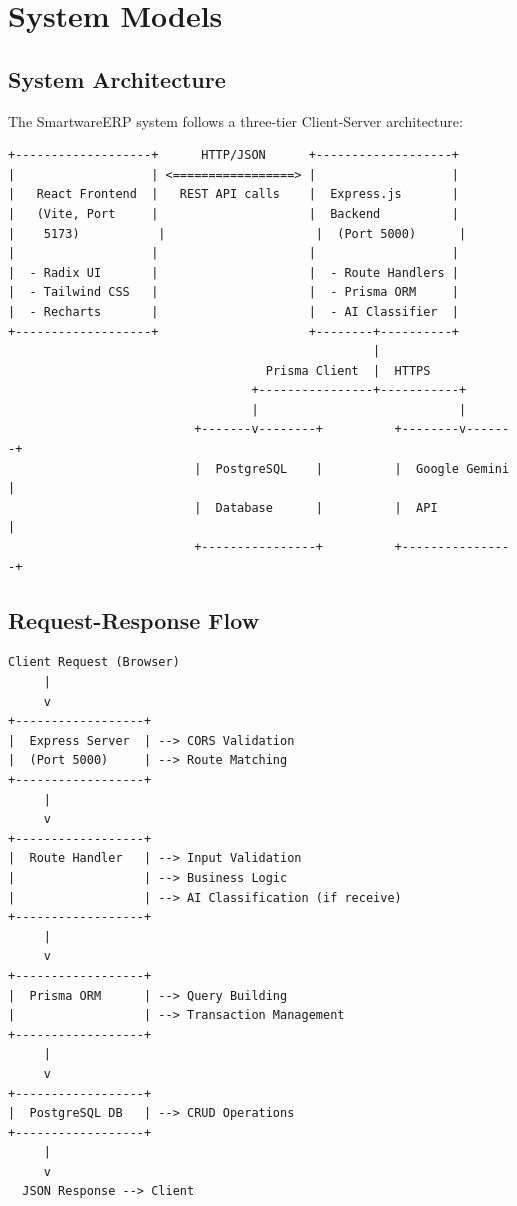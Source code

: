 \documentclass[12pt,a4paper]{report}
\begin{document}
\chapter{System Models}

\section{System Architecture}
The SmartwareERP system follows a three-tier Client-Server architecture:

\begin{verbatim}
+-------------------+      HTTP/JSON      +-------------------+
|                   | <=================> |                   |
|   React Frontend  |   REST API calls    |  Express.js       |
|   (Vite, Port     |                     |  Backend          |
|    5173)           |                     |  (Port 5000)      |
|                   |                     |                   |
|  - Radix UI       |                     |  - Route Handlers |
|  - Tailwind CSS   |                     |  - Prisma ORM     |
|  - Recharts       |                     |  - AI Classifier  |
+-------------------+                     +--------+----------+
                                                   |
                                    Prisma Client  |  HTTPS
                                  +----------------+-----------+
                                  |                            |
                          +-------v--------+          +--------v-------+
                          |  PostgreSQL    |          |  Google Gemini |
                          |  Database      |          |  API           |
                          +----------------+          +----------------+
\end{verbatim}

\section{Request-Response Flow}
\begin{verbatim}
Client Request (Browser)
     |
     v
+------------------+
|  Express Server  | --> CORS Validation
|  (Port 5000)     | --> Route Matching
+------------------+
     |
     v
+------------------+
|  Route Handler   | --> Input Validation
|                  | --> Business Logic
|                  | --> AI Classification (if receive)
+------------------+
     |
     v
+------------------+
|  Prisma ORM      | --> Query Building
|                  | --> Transaction Management
+------------------+
     |
     v
+------------------+
|  PostgreSQL DB   | --> CRUD Operations
+------------------+
     |
     v
  JSON Response --> Client
\end{verbatim}
\end{document}
